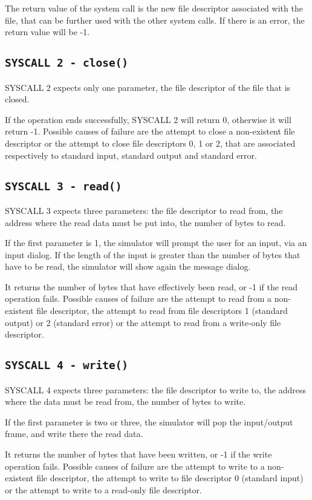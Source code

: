 \documentclass[12pt]{report}
\begin{document}
The return value of the system call is the new file descriptor associated with
the file, that can be further used with the other system calls. If there is an
error, the return value will be -1.

\subsection{\texttt{SYSCALL 2 - close()}}
SYSCALL 2 expects only one parameter, the file descriptor of the file that is
closed.

If the operation ends successfully, SYSCALL 2 will return 0, otherwise it will
return -1. Possible causes of failure are the attempt to close a non-existent
file descriptor or the attempt to close file descriptors 0, 1 or 2, that are
associated respectively to standard input, standard output and standard error.

\subsection{\texttt{SYSCALL 3 - read()}}
SYSCALL 3 expects three parameters: the file descriptor to read from, the
address where the read data must be put into, the number of bytes to read.

If the first parameter is 1, the simulator will prompt the user for an input,
via an input dialog. If the length of the input is greater than the number of
bytes that have to be read, the simulator will show again the message dialog.

It returns the number of bytes that have effectively been read, or -1 if the
read operation fails. Possible causes of failure are the attempt to read from a
non-existent file descriptor, the attempt to read from file descriptors 1
(standard output) or 2 (standard error) or the attempt to read from a write-only
file descriptor.

\subsection{\texttt{SYSCALL 4 - write()}}
SYSCALL 4 expects three parameters: the file descriptor to write to, the address
where the data must be read from, the number of bytes to write.

If the first parameter is two or three, the simulator will pop the input/output
frame, and write there the read data.

It returns the number of bytes that have been written, or -1 if the write
operation fails. Possible causes of failure are the attempt to write to a
non-existent file descriptor, the attempt to write to file descriptor 0
(standard input) or the attempt to write to a read-only file descriptor.
\end{document}
